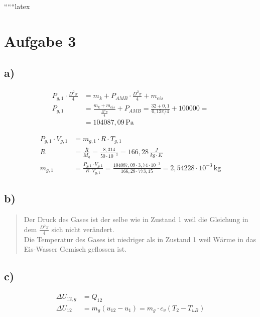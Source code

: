 
``````latex


\section*{Aufgabe 3}

\subsection*{a)}

\begin{align*}
P_{g,1} \cdot \frac{D^2 \pi}{4} &= m_k + P_{AMB} \cdot \frac{D^2 \pi}{4} + m_{eis} \\
P_{g,1} &= \frac{m_k + m_{eis}}{\frac{D^2 \pi}{4}} + P_{AMB} = \frac{32 + 0,1}{0,12 \pi / 4} + 100000 = \\
&= 104087,09 \, \text{Pa}
\end{align*}

\begin{align*}
P_{g,1} \cdot V_{g,1} &= m_{g,1} \cdot R \cdot T_{g,1} \\
R &= \frac{\overline{R}}{M_g} = \frac{8,314}{50 \cdot 10^{-3}} = 166,28 \, \frac{J}{kg \cdot K} \\
m_{g,1} &= \frac{P_{g,1} \cdot V_{g,1}}{R \cdot T_{g,1}} = \frac{104087,09 \cdot 3,74 \cdot 10^{-3}}{166,28 \cdot 773,15} = 2,54228 \cdot 10^{-3} \, \text{kg}
\end{align*}

\subsection*{b)}

\begin{quote}
Der Druck des Gases ist der selbe wie in Zustand 1 weil die Gleichung in dem \(\frac{D^2 \pi}{4}\) sich nicht verändert. \\
Die Temperatur des Gases ist niedriger als in Zustand 1 weil Wärme in das Eis-Wasser Gemisch geflossen ist.
\end{quote}

\subsection*{c)}

\begin{align*}
\Delta U_{12,g} &= Q_{12} \\
\Delta U_{12} &= m_g (u_{12} - u_1) = m_g \cdot c_v (T_2 - T_{uB})
\end{align*}

